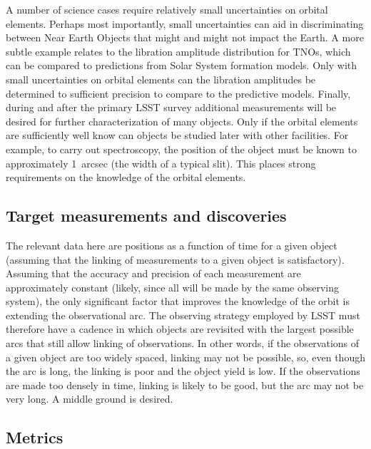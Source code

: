 A number of science cases require relatively small
uncertainties on orbital elements. Perhaps most 
importantly, small uncertainties can aid in
discriminating between Near Earth Objects that
might and might not impact the Earth. A more subtle
example relates to the libration amplitude
distribution for TNOs, which can be compared
to predictions from Solar System formation models.
Only with small uncertainties on orbital elements
can the libration amplitudes be determined
to sufficient precision to compare to the predictive
models. Finally, during and after the primary
LSST survey additional measurements will be desired
for further characterization of many objects. 
Only if the orbital elements are sufficiently well
know can objects be studied later with other
facilities. For example, to carry out spectroscopy,
the position of the object must be known to
approximately 1~arcsec (the width of a typical
slit). This places strong requirements on the 
knowledge of the orbital elements.



\subsection{Target measurements and discoveries}
\label{sec:\secname:targets}

The relevant data here are positions as a function
of time for a given object (assuming that the
linking of measurements to a given object
is satisfactory). Assuming that the 
accuracy and precision of each measurement are approximately
constant (likely, since all will be made by the
same observing system), the only significant 
factor that improves the knowledge of the orbit
is extending the observational arc. The observing
strategy employed by LSST must therefore have a cadence
in which objects are revisited with the largest possible
arcs that still allow linking of observations. In other words,
if the observations of a given object are too widely spaced,
linking may not be possible, so, even though the arc
is long, the linking is poor and the object yield
is low. If the observations are made too densely in 
time, linking is likely to be good, but the arc
may not be very long. A middle ground is desired.


\subsection{Metrics}
\label{sec:\secname:metrics}

